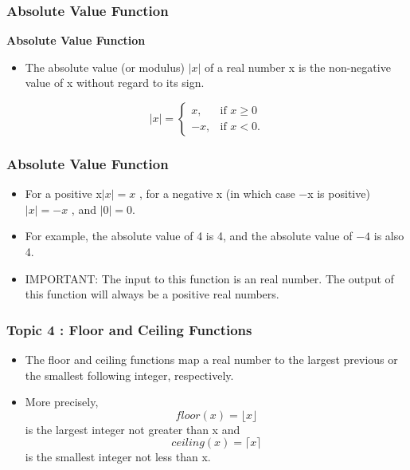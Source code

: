 \documentclass{beamer}
\begin{document}
\begin{frame}
	\frametitle{Absolute Value Function}
	\Large
	\textbf{Absolute Value Function}
	\begin{itemize}
	\item The absolute value (or modulus) $|x|$ of a real number x is the non-negative value of x without regard to its sign. 
	
	\end{itemize}
	\[|x| = \begin{cases} x, & \mbox{if }  x \ge 0  \\ -x,  & \mbox{if } x < 0. \end{cases} \]
\end{frame}
\begin{frame}
	\frametitle{Absolute Value Function}
	\Large
	\vspace{-1cm}
\begin{itemize}

	\item For a positive x$|x| = x$ , for a negative x (in which case −x is positive) $|x| = -x$ , and $|0| = 0$. 
	\item For example, the absolute value of 4 is 4, and the absolute value of $-4$ is also 4. 
	\item IMPORTANT:  The input to this function is an real number. The output of this function will always be a positive real numbers.
\end{itemize}


\end{frame}
\begin{frame}
	\frametitle{Topic 4 : Floor and Ceiling Functions}
	\Large
	\begin{itemize}
	\item The floor and ceiling functions map a real number to the largest previous or the smallest following integer, respectively. \item More precisely, \[floor(x) = \lfloor x\rfloor \] is the largest integer not greater than x and \[ceiling(x) =  \lceil x \rceil \] is the smallest integer not less than x.
	\end{itemize}
	
	
\end{frame}
\end{document}
